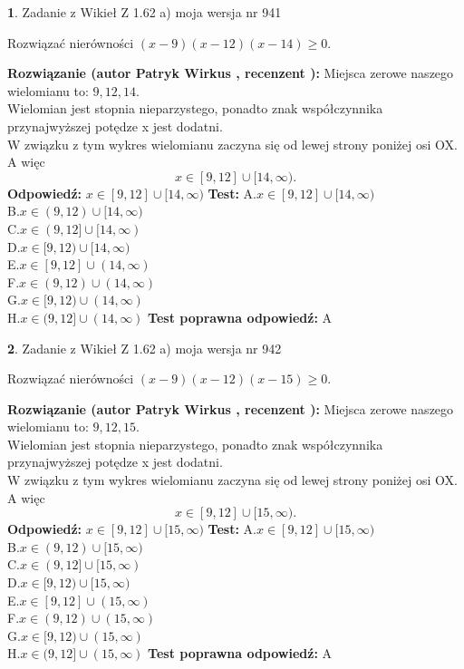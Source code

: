 \documentclass[12pt, a4paper]{article}
\theoremstyle{definition} %
\newtheorem{zad}{}
\newcommand{\zadStart}[1]{\begin{zad}#1\newline}
\newcommand{\zadStop}{\end{zad}}
\newcommand{\rozwStart}[2]{\noindent \textbf{Rozwiązanie (autor #1 , recenzent #2): }\newline}
\newcommand{\rozwStop}{\newline}
\newcommand{\odpStart}{\noindent \textbf{Odpowiedź:}\newline}
\newcommand{\odpStop}{\newline}
\newcommand{\testStart}{\noindent \textbf{Test:}\newline}
\newcommand{\testStop}{\newline}
\newcommand{\kluczStart}{\noindent \textbf{Test poprawna odpowiedź:}\newline}
\newcommand{\kluczStop}{\newline}
\begin{document}
\zadStart{Zadanie z Wikieł Z 1.62 a) moja wersja nr 941}

Rozwiązać nierówności $(x-9)(x-12)(x-14)\ge0$.
\zadStop
\rozwStart{Patryk Wirkus}{}
Miejsca zerowe naszego wielomianu to: $9, 12, 14$.\\
Wielomian jest stopnia nieparzystego, ponadto znak współczynnika przy\linebreak najwyższej potędze x jest dodatni.\\ W związku z tym wykres wielomianu zaczyna się od lewej strony poniżej osi OX. A więc $$x \in [9,12] \cup [14,\infty).$$
\rozwStop
\odpStart
$x \in [9,12] \cup [14,\infty)$
\odpStop
\testStart
A.$x \in [9,12] \cup [14,\infty)$\\
B.$x \in (9,12) \cup [14,\infty)$\\
C.$x \in (9,12] \cup [14,\infty)$\\
D.$x \in [9,12) \cup [14,\infty)$\\
E.$x \in [9,12] \cup (14,\infty)$\\
F.$x \in (9,12) \cup (14,\infty)$\\
G.$x \in [9,12) \cup (14,\infty)$\\
H.$x \in (9,12] \cup (14,\infty)$
\testStop
\kluczStart
A
\kluczStop



\zadStart{Zadanie z Wikieł Z 1.62 a) moja wersja nr 942}

Rozwiązać nierówności $(x-9)(x-12)(x-15)\ge0$.
\zadStop
\rozwStart{Patryk Wirkus}{}
Miejsca zerowe naszego wielomianu to: $9, 12, 15$.\\
Wielomian jest stopnia nieparzystego, ponadto znak współczynnika przy\linebreak najwyższej potędze x jest dodatni.\\ W związku z tym wykres wielomianu zaczyna się od lewej strony poniżej osi OX. A więc $$x \in [9,12] \cup [15,\infty).$$
\rozwStop
\odpStart
$x \in [9,12] \cup [15,\infty)$
\odpStop
\testStart
A.$x \in [9,12] \cup [15,\infty)$\\
B.$x \in (9,12) \cup [15,\infty)$\\
C.$x \in (9,12] \cup [15,\infty)$\\
D.$x \in [9,12) \cup [15,\infty)$\\
E.$x \in [9,12] \cup (15,\infty)$\\
F.$x \in (9,12) \cup (15,\infty)$\\
G.$x \in [9,12) \cup (15,\infty)$\\
H.$x \in (9,12] \cup (15,\infty)$
\testStop
\kluczStart
A
\kluczStop
\end{document}
